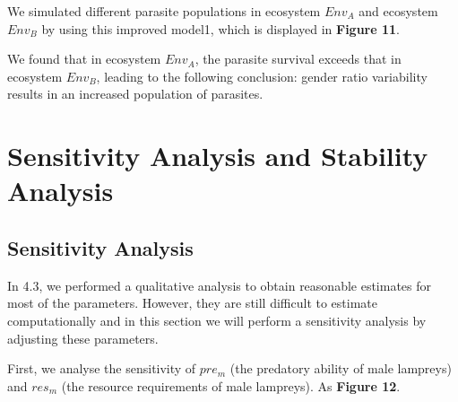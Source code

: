 \documentclass{mcmthesis}
\begin{document}
We simulated different parasite populations in ecosystem $Env_{A}$ and ecosystem $Env_{B}$ by using this improved model1, which is displayed in \textbf{Figure 11}. 

We found that in ecosystem $Env_{A}$, the parasite survival exceeds that in ecosystem $Env_{B}$, leading to the following conclusion: gender ratio variability results in an increased population of parasites.  

\section{Sensitivity Analysis and Stability Analysis}
\subsection{Sensitivity Analysis}
In 4.3, we performed a qualitative analysis to obtain reasonable estimates for most of the parameters. However, they are still difficult to estimate computationally and in this section we will perform a sensitivity analysis by adjusting these parameters. 

First, we analyse the sensitivity of $pre_m$ (the predatory ability of male lampreys) and $res_m$ (the resource requirements of male lampreys). As \textbf{Figure 12}.
\end{document}

